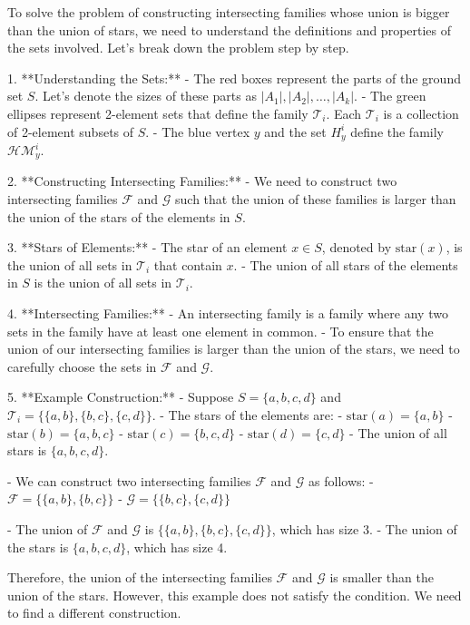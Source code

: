 To solve the problem of constructing intersecting families whose union is bigger than the union of stars, we need to understand the definitions and properties of the sets involved. Let's break down the problem step by step.

1. **Understanding the Sets:**
   - The red boxes represent the parts of the ground set \( S \). Let's denote the sizes of these parts as \( |A_1|, |A_2|, \ldots, |A_k| \).
   - The green ellipses represent 2-element sets that define the family \( \mathcal{T}_i \). Each \( \mathcal{T}_i \) is a collection of 2-element subsets of \( S \).
   - The blue vertex \( y \) and the set \( H_y^i \) define the family \( \mathcal{HM}_y^i \).

2. **Constructing Intersecting Families:**
   - We need to construct two intersecting families \( \mathcal{F} \) and \( \mathcal{G} \) such that the union of these families is larger than the union of the stars of the elements in \( S \).

3. **Stars of Elements:**
   - The star of an element \( x \in S \), denoted by \( \text{star}(x) \), is the union of all sets in \( \mathcal{T}_i \) that contain \( x \).
   - The union of all stars of the elements in \( S \) is the union of all sets in \( \mathcal{T}_i \).

4. **Intersecting Families:**
   - An intersecting family is a family where any two sets in the family have at least one element in common.
   - To ensure that the union of our intersecting families is larger than the union of the stars, we need to carefully choose the sets in \( \mathcal{F} \) and \( \mathcal{G} \).

5. **Example Construction:**
   - Suppose \( S = \{a, b, c, d\} \) and \( \mathcal{T}_i = \{\{a, b\}, \{b, c\}, \{c, d\}\} \).
   - The stars of the elements are:
     - \( \text{star}(a) = \{a, b\} \)
     - \( \text{star}(b) = \{a, b, c\} \)
     - \( \text{star}(c) = \{b, c, d\} \)
     - \( \text{star}(d) = \{c, d\} \)
   - The union of all stars is \( \{a, b, c, d\} \).

   - We can construct two intersecting families \( \mathcal{F} \) and \( \mathcal{G} \) as follows:
     - \( \mathcal{F} = \{\{a, b\}, \{b, c\}\} \)
     - \( \mathcal{G} = \{\{b, c\}, \{c, d\}\} \)

   - The union of \( \mathcal{F} \) and \( \mathcal{G} \) is \( \{\{a, b\}, \{b, c\}, \{c, d\}\} \), which has size 3.
   - The union of the stars is \( \{a, b, c, d\} \), which has size 4.

Therefore, the union of the intersecting families \( \mathcal{F} \) and \( \mathcal{G} \) is smaller than the union of the stars. However, this example does not satisfy the condition. We need to find a different construction.

